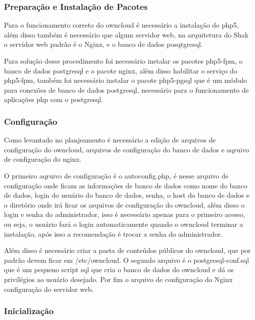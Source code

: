 \subsubsection{Preparação e Instalação de Pacotes}

Para o funcionamento correto do owncloud é necessário a instalação do php5, além
disso também é necessário que algum servidor web, na arquitetura do Shak o servidor
web padrão é o Nginx, e o banco de dados posqtgresql.

Para solução desse procedimento foi necessário instalar os pacotes php5-fpm, o banco
de dados postgresql e o pacote nginx, além disso habilitar o serviço do php5-fpm,
também foi necessário instalar o pacote php5-pgsql que é um módulo para
conexões de banco de dados postgresql, necessário para o funcionamento de
aplicações php com o postgresql.

\subsubsection{Configuração}

Como levantado no planjeamento é necessário a edição de arquivos de configuração
do owncloud, arquivos de configuração do banco de dados e aqruivo de configuração
do nginx.

O primeiro aqruivo de configuração é o autoconfig.php, é nesse arquivo de
configuração onde ficam as informações de banco de dados como nome do banco de dados,
login do usuário do banco de dados, senha, o host do banco de dados e o diretório
onde irá ficar os arquivos de configuração do owncloud, além disso o login e senha
do administrador, isso é necessário apenas para o primeiro acesso, ou seja, o usuário
fará o login automaticamente quando o owncloud terminar a instalação, após isso
a recomendação é trocar a senha do administrador.

Além disso é necessário criar a pasta de conteúdos públicos do owncloud, que por
padrão devem ficar em /etc/owncloud. O segundo arquivo é o postgresql-conf.sql
que é um pequeno script sql que cria o banco de dados do owncloud e dá os
privilégios ao usuário desejado. Por fim o arquivo de configuração do Nginx
configuração do servidor web.

\subsubsection{Inicialização}


